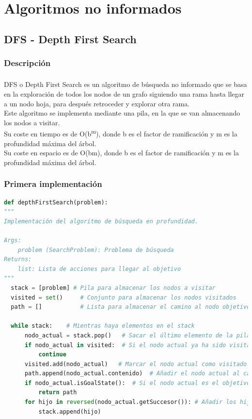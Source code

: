 \documentclass{report}
\begin{document}
    \chapter{Algoritmos no informados}
      \section{DFS - Depth First Search}
        \subsection*{Descripción}
          \paragraph*{}{
            DFS o Depth First Search es un algoritmo de búsqueda no informado que se basa en la exploración de todos los nodos de un grafo siguiendo una rama hasta llegar a un nodo hoja, para después retroceder y explorar otra rama.\\
            Este algoritmo se implementa mediante una pila, en la que se van almacenando los nodos a visitar.\\
            Su coste en tiempo es de O(b\textsuperscript{m}), donde b es el factor de ramificación y m es la profundidad máxima del árbol.\\
            Su coste en espacio es de O(bm), donde b es el factor de ramificación y m es la profundidad máxima del árbol.\\
          }
          
        \subsection*{Primera implementación}
          \begin{lstlisting}[language=Python, caption=Implementación final del DFS]
def depthFirstSearch(problem):
"""
Implementación del algoritmo de búsqueda en profundidad.

Args:
    problem (SearchProblem): Problema de búsqueda
Returns:
    list: Lista de acciones para llegar al objetivo
"""
  stack = [problem] # Pila para almacenar los nodos a visitar
  visited = set()     # Conjunto para almacenar los nodos visitados
  path = []           # Lista para almacenar el camino al nodo objetivo

  while stack:    # Mientras haya elementos en el stack
      nodo_actual = stack.pop()   # Sacar el último elemento de la pila
      if nodo_actual in visited:  # Si el nodo actual ya ha sido visitado
          continue
      visited.add(nodo_actual)   # Marcar el nodo actual como visitado
      path.append(nodo_actual.contenido)  # Añadir el nodo actual al camino
      if nodo_actual.isGoalState():  # Si el nodo actual es el objetivo
          return path
      for hijo in reversed(nodo_actual.getSuccesor()): # Añadir los hijos del nodo actual a la pila
          stack.append(hijo)
          \end{lstlisting}
\end{document}
